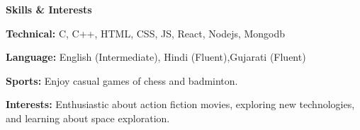 \documentclass[11pt]{article}
\begin{document}
\vspace{12pt}


\begin{center}
    \textbf{Skills \& Interests }
\end{center}

\textbf{Technical:} C, C++, HTML, CSS, JS, React, Nodejs, Mongodb

\textbf{Language:} English (Intermediate), Hindi (Fluent),Gujarati (Fluent)

\textbf{Sports:} Enjoy casual games of chess and badminton.

\textbf{Interests:} Enthusiastic about action fiction movies, exploring new technologies, and learning about space exploration.
\end{document}
